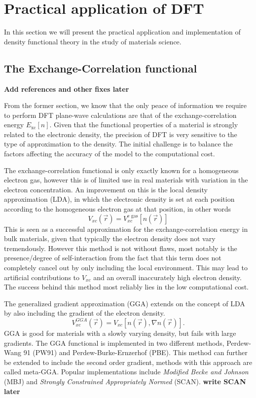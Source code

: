 \chapter{Practical application of DFT}
\label{sec:Practical DFT}

In this section we will present the practical application and implementation of density functional theory in the study of materials science.

\section{The Exchange-Correlation functional}
\textbf{Add references and other fixes later}

From the former section, we know that the only peace of information we require to perform DFT plane-wave calculations are that of the exchange-correlation energy $E_{\text{xc}}[n]$. Given that the functional properties of a material is strongly related to the electronic density, the precision of DFT is very sensitive to the type of approximation to the density. The initial challenge is to balance the factors affecting the accuracy of the model to the computational cost.

The exchange-correlation functional is only exactly known for a homogeneous electron gas, however this is of limited use in real materials with variation in the electron concentration. An improvement on this is the local density approximation (LDA), in which the electronic density is set at each position according to the homogeneous electron gas at that position, in other words
\begin{equation}
    V_{xc}(\vec{r}) = V_{xc}^{\text{e gas}}[n(\vec{r})]
\end{equation}
This is seen as a successful approximation for the exchange-correlation energy in bulk materials, given that typically the electron density does not vary tremendously. However this method is not without flaws, most notably is the presence/degree of self-interaction from the fact that this term does not completely cancel out by only including the local environment. This may lead to artificial contributions to $V_{xc}$ and an overall inaccurately high electron density. The success behind this method most reliably lies in the low computational cost. 

The generalized gradient approximation (GGA) extends on the concept of LDA by also including the gradient of the electron density. 
\begin{equation}
    V_{xc}^{GGA}(\vec{r}) = V_{xc}[n(\vec{r}), \nabla n(\vec{r})].
\end{equation}
GGA is good for materials with a slowly varying density, but fails with large gradients. The GGA functional is implemented in two different methods, Perdew-Wang 91 (PW91) and Perdew-Burke-Ernzerhof (PBE). This method can further be extended to include the second order gradient, methods with this approach are called meta-GGA. Popular implementations include \textit{Modified Becke and Johnson} (MBJ) and \textit{Strongly Constrained Appropriately Normed} (SCAN). \textbf{write SCAN later}

